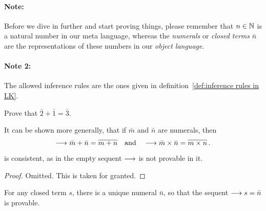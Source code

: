 \paragraph{Note:}
Before we dive in further and start proving things,
please remember that \(n\in\mathbb{N}\) is a natural number
in our meta language, whereas the \emph{numerals} or
\emph{closed terms} \(\bar n\) are the representations of
these numbers in our \emph{object language}.

\paragraph{Note 2:}
The allowed inference rules are the ones given in
definition~\ref{def:inference rules in LK}.

\begin{exercise}[PA.1]\label{exe_PA.1}
    Prove that \(\bar2 + \bar1 = \bar3\).
\end{exercise}

It can be shown more generally, that if \(\bar m\) and \(\bar n\)
are numerals, then
\begin{equation*}
    \longrightarrow\bar m + \bar n = \overline{m + n}
    \quad\text{and}\quad
    \longrightarrow\bar m \times \bar n = \overline{m \times n}\,.
\end{equation*}

\begin{proposition}[9.4]\label{prop:9.4}
    \PA{} is consistent, as in the empty sequent \(\longrightarrow\)
    is not provable in it.
\end{proposition}

\begin{proof}
    Omitted. This is taken for granted.
\end{proof}

\begin{proposition}[9.6.1]\label{prop:9.6.1}
    For any closed term \(s\), there is a unique numeral \(\bar n\),
    so that the sequent \(\longrightarrow s = \bar n\) is provable.
\end{proposition}

